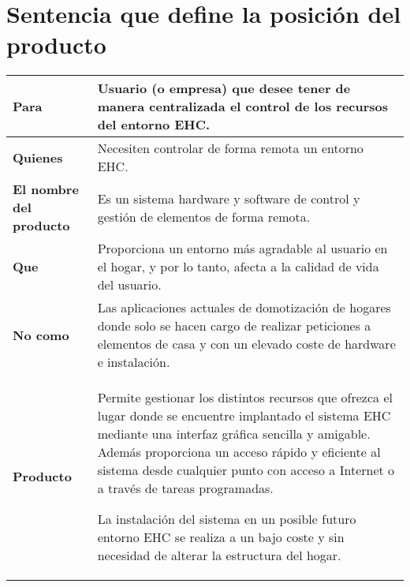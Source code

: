 \section{Sentencia que define la posición del producto}
    \begin{tabular}{|p{6cm}|p{10cm}|}
        \hline \textbf{Para} &  Usuario (o empresa) que desee  tener de manera centralizada el control de los recursos del entorno EHC.\\
        \hline \textbf{Quienes} & Necesiten controlar de forma remota un entorno EHC.\\
        \hline \textbf{El nombre del producto} & Es un sistema hardware y software de control y gestión de elementos de forma remota. \\
        \hline \textbf{Que} & Proporciona un entorno más agradable al usuario en el hogar, y por lo tanto, afecta a la calidad de vida del usuario.\\
        \hline \textbf{No como} & Las aplicaciones actuales de domotización de hogares donde solo se hacen cargo de realizar peticiones a elementos de casa y con un elevado coste de hardware e instalación. \\
        \hline \textbf{Producto} & Permite gestionar los distintos recursos que ofrezca el lugar donde se encuentre implantado el sistema EHC mediante una interfaz gráfica sencilla y amigable. Además proporciona un acceso rápido y eficiente al sistema desde cualquier punto con acceso a Internet o a través de tareas programadas. \par
        La instalación del sistema en un posible futuro entorno EHC se realiza a un bajo coste y sin necesidad de alterar la estructura del hogar. \\
        \hline
    \end{tabular}

